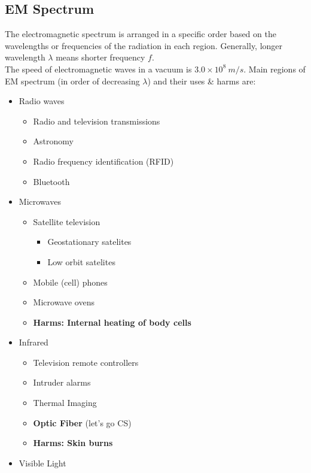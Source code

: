 \documentclass[a4paper,12pt]{article}
\begin{document}
\subsection{EM Spectrum}
The electromagnetic spectrum is arranged in a specific order based on the wavelengths or frequencies of the radiation in each region. Generally, longer wavelength \(\lambda\) means shorter frequency \(f\).\\ The speed of electromagnetic waves in a vacuum is \(3.0\times 10^8\ m/s\).
Main regions of EM spectrum (in order of decreasing \(\lambda\)) and their uses \& harms are:
\begin{itemize}
    \item Radio waves
    \begin{itemize}
        \item Radio and television transmissions
        \item Astronomy
        \item Radio frequency identification (RFID)
        \item Bluetooth
    \end{itemize}
    \item Microwaves
    \begin{itemize}
        \item Satellite television
        \begin{itemize}
            \item Geostationary satelites
            \item Low orbit satelites
        \end{itemize}
        \item Mobile (cell) phones
        \item Microwave ovens
        \item \textbf{Harms: Internal heating of body cells}
    \end{itemize}
    \item Infrared
    \begin{itemize}
        \item Television remote controllers
        \item Intruder alarms
        \item Thermal Imaging
        \item \textbf{Optic Fiber} (let's go CS)
        \item \textbf{Harms: Skin burns}
    \end{itemize}
    \item Visible Light
    \begin{itemize}

\end{itemize}
\end{itemize}
\end{document}
